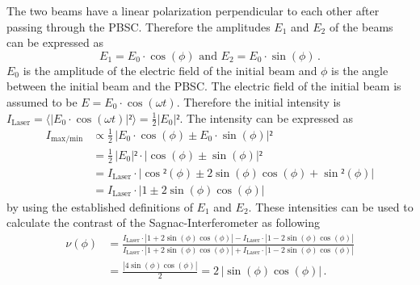  The two beams have a linear polarization perpendicular to each other after passing through the PBSC. 
 Therefore the amplitudes $E_1$ and $E_2$ of the beams can be expressed as 
 \begin{equation}
    E_1 = E_0 \cdot \cos(\phi) \,\, \text{and} \,\, E_2 = E_0 \cdot \sin(\phi) \, .
    \label{eqn:E_Felder}
 \end{equation}
 $E_0$ is the amplitude of the electric field of the initial beam and $\phi$ is the angle between the initial beam and the PBSC. 
 The electric field of the initial beam is assumed to be $E = E_0 \cdot \cos(\omega t)$. Therefore the initial intensity is
 $I_{\text{Laser}} = \langle |E_0 \cdot \cos(\omega t)|² \rangle = \frac{1}{2} |E_0|²$.
 The intensity can be expressed as 
 \begin{align*}
    I_{\text{max/min}} &\propto \frac{1}{2} \, |E_0 \cdot \cos(\phi) \pm E_0 \cdot \sin(\phi)|² \\
    &= \frac{1}{2} \,|E_0|² \cdot |\cos(\phi) \pm \sin(\phi)|² \\
    &= I_{\text{Laser}}  \cdot |\cos²(\phi) \pm 2\sin(\phi)\cos(\phi) + \sin²(\phi)| \\
    &= I_{\text{Laser}}  \cdot |1 \pm 2\sin(\phi)\cos(\phi)|
 \end{align*}
 by using the established definitions of $E_1$ and $E_2$. 
 These intensities can be used to calculate the contrast of the Sagnac-Interferometer as following 
 \begin{align}
    \nu(\phi) &= \frac{I_{\text{Laser}}  \cdot |1 + 2\sin(\phi)\cos(\phi)|- I_{\text{Laser}}  \cdot |1 - 2\sin(\phi)\cos(\phi)|}{I_{\text{Laser}}  \cdot |1 + 2\sin(\phi)\cos(\phi)|+ I_{\text{Laser}}  \cdot |1 - 2\sin(\phi)\cos(\phi)|} \nonumber \\
    &= \frac{|4 \sin(\phi)\cos(\phi)|}{2} = 2 \, |\sin(\phi)\cos(\phi)| \, . 
    \label{eqn:contrast_Sagnac}
 \end{align}

